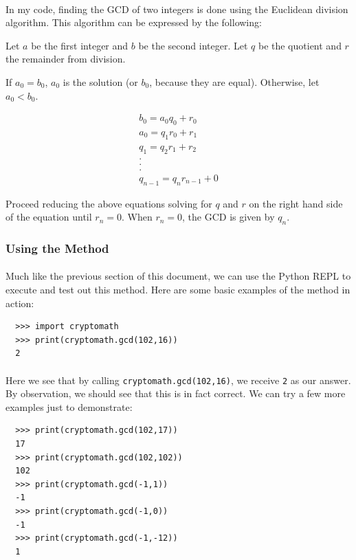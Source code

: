 \documentclass[12pt,a4paper]{article}
\begin{document}
\paragraph{}
In my code, finding the GCD of two integers is done using the Euclidean 
division algorithm.  This algorithm can be expressed by the following:

Let $a$ be the first integer and $b$ be the second integer.  Let $q$ be the 
quotient and $r$ the remainder from division.

If $a_0 = b_0$, $a_0$ is the solution (or $b_0$, because they are equal).  Otherwise, 
let $a_0 < b_0$.

\begin{gather*}
b_0 = a_0 q_0 + r_0 \\
a_0 = q_1 r_0 + r_1 \\
q_1 = q_2 r_1 + r_2 \\
. \\
. \\
. \\
q_{n-1} = q_n r_{n-1} + 0
\end{gather*}

Proceed reducing the above equations solving for $q$ and $r$ on the right 
hand side of the equation until $r_n = 0$.  When $r_n = 0$, the GCD is given 
by $q_n$.

\subsubsection{Using the Method}
\paragraph{}
Much like the previous section of this document, we can use the Python REPL to 
execute and test out this method.  Here are some basic examples of the method 
in action:

\begin{verbatim}
  >>> import cryptomath
  >>> print(cryptomath.gcd(102,16))
  2
\end{verbatim}

\paragraph{}
Here we see that by calling \verb|cryptomath.gcd(102,16)|, we receive 
\verb|2| as our answer.  By observation, we should see that this is in fact 
correct.  We can try a few more examples just to demonstrate:

\begin{verbatim}
  >>> print(cryptomath.gcd(102,17)) 
  17
  >>> print(cryptomath.gcd(102,102)) 
  102
  >>> print(cryptomath.gcd(-1,1))    
  -1
  >>> print(cryptomath.gcd(-1,0)) 
  -1
  >>> print(cryptomath.gcd(-1,-12)) 
  1
\end{verbatim}
\end{document}
